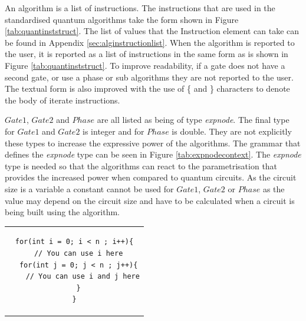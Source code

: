 An algorithm is a list of instructions.
The instructions that are used in the standardised quantum algorithms take the form shown in Figure \ref{tab:quantinststruct}.
The list of values that the Instruction element can take can be found in Appendix \ref{sec:alginstructionlist}.
When the algorithm is reported to the user, it is reported as a list of instructions in the same form as is shown in Figure \ref{tab:quantinststruct}.
To improve readability, if a gate does not have a second gate, or use a phase or sub algorithms they are not reported to the user.
The textual form is also improved with the use of \{ and \} characters to denote the body of iterate instructions.

$Gate1$, $Gate2$ and $Phase$ are all listed as being of type \emph{expnode}.
The final type for $Gate1$ and $Gate2$ is integer and for $Phase$ is double.
They are not explicitly these types to increase the expressive power of the algorithms.
The grammar that defines the \emph{expnode} type can be seen in Figure \ref{tab:expnodecontext}.
The \emph{expnode} type is needed so that the algorithms can react to the parametrisation that provides the increased power when compared to quantum circuits.
As the circuit size is a variable a constant cannot be used for $Gate1$, $Gate2$ or $Phase$ as the value may depend on the circuit size and have to be calculated when a circuit is being built using the algorithm.

\lstset{numbers=left,language=Java}
\begin{center}
\begin{tabular}{c}
\begin{lstlisting}
for(int i = 0; i < n ; i++){
  // You can use i here
  for(int j = 0; j < n ; j++){
    // You can use i and j here
  }
}
\end{lstlisting}
\end{tabular}
\end{center}

